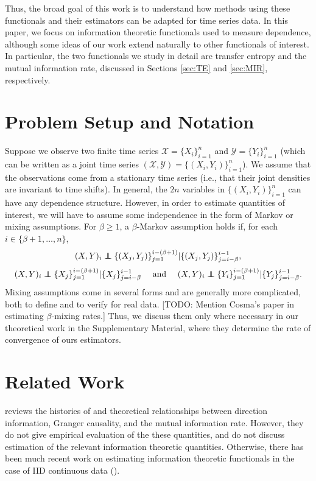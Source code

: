 \documentclass{article} %
\newcommand{\X}{\mathcal{X}}                        %
\newcommand{\Y}{\mathcal{Y}}                        %
\newcommand\ind{\protect\mathpalette{\protect\independenT}{\perp}}
\def\independenT#1#2{\mathrel{\rlap{$#1#2$}\mkern2mu{#1#2}}}
\begin{document}
Thus, the broad goal of this work is to understand how methods using these
functionals and their estimators can be adapted for time series data.
In this paper, we focus on information theoretic functionals used to measure
dependence, although some ideas of our work extend naturally to other
functionals of interest. In particular, the two functionals we study in detail
are transfer entropy and the mutual information rate, discussed in Sections
\ref{sec:TE} and \ref{sec:MIR}, respectively.

\section{Problem Setup and Notation}
Suppose we observe two finite time series $\X = \{X_i\}_{i = 1}^n$ and
$\Y = \{Y_i\}_{i = 1}^n$ (which can be written as a joint time series
$(\X, \Y) = \{(X_i,Y_i)\}_{i = 1}^n$). We assume that the observations come
from a stationary time series (i.e., that their joint densities are invariant
to time shifts). In general, the $2n$ variables in $\{(X_i,Y_i)\}_{i = 1}^n$
can have any dependence structure. However, in order to estimate quantities of
interest, we will have to assume some independence in the form of Markov or
mixing assumptions. For $\beta \geq 1$, a $\beta$-Markov assumption holds if,
for each $i \in \{\beta + 1,\dots,n\}$,
\begin{equation}
(X,Y)_i \ind \{(X_j,Y_j)\}_{j = 1}^{i - (\beta + 1)}
                                    | \{(X_j,Y_j)\}_{j = i - \beta}^{i - 1},
\label{joint_markov}
\end{equation}
\begin{equation}
(X,Y)_i \ind \{X_j\}_{j = 1}^{i - (\beta + 1)}
                                            | \{X_j\}_{j = i - \beta}^{i - 1}
    \quad \mbox{ and } \quad
(X,Y)_i \ind \{Y_i\}_{j = 1}^{i - (\beta + 1)}
                                        | \{Y_j\}_{j = i - \beta}^{i - 1}.
\label{marginal_markov}
\end{equation}
Mixing assumptions come in several forms and are generally more complicated,
both to define and to verify for real data. [TODO: Mention Cosma's paper in
estimating $\beta$-mixing rates.] Thus, we discuss them only where necessary
in our theoretical work in the Supplementary Material, where they determine the
rate of convergence of ours estimators.

\section{Related Work}
\cite{amblard2012relation} reviews the histories of and theoretical
relationships between direction information, Granger causality, and the mutual
information rate. However, they do not give empirical evaluation of the these
quantities, and do not discuss estimation of the relevant information theoretic
quantities. Otherwise, there has been much recent work on estimating
information theoretic functionals in the case of IID continuous data
(\cite{pal2010estimation,nguyen2010estimating,singh14densityfunc,krishnamurthy14divergences,moon14ensemble,gao2014stronglyDependent}).
\end{document}
